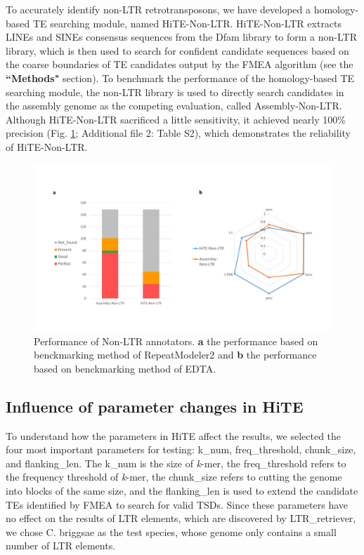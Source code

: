 \documentclass{bmcart}
\begin{document}
To accurately identify non-LTR retrotransposons, we have developed a homology-based TE searching module, named HiTE-Non-LTR. HiTE-Non-LTR extracts LINEs and SINEs consensus sequences from the Dfam library to form a non-LTR library, which is then used to search for confident candidate sequences based on the coarse boundaries of TE candidates output by the FMEA algorithm (see the \textbf{``Methods"} section). To benchmark the performance of the homology-based TE searching module, the non-LTR library is used to directly search candidates in the assembly genome as the competing evaluation, called Assembly-Non-LTR. Although HiTE-Non-LTR sacrificed a little sensitivity, it achieved nearly 100\% precision (Fig. \ref{fig:non_ltr_results}; Additional file 2: Table S2), which demonstrates the reliability of HiTE-Non-LTR.


\begin{figure}[h!]
	\centerline{\includegraphics[width=1.0\textwidth]{figures/NonLTRResults.pdf}}
	\caption{Performance of Non-LTR annotators. \textbf{a} the performance based on benckmarking method of RepeatModeler2 and \textbf{b} the performance based on benckmarking method of EDTA.}
	\label{fig:non_ltr_results}
\end{figure}


\subsection*{Influence of parameter changes in HiTE}
To understand how the parameters in HiTE affect the results, we selected the four most important parameters for testing: k\_num, freq\_threshold, chunk\_size, and flanking\_len. The k\_num is the size of \emph{k}-mer, the freq\_threshold refers to the frequency threshold of \emph{k}-mer, the chunk\_size refers to cutting the genome into blocks of the same size, and the flanking\_len is used to extend the candidate TEs identified by FMEA to search for valid TSDs. Since these parameters have no effect on the results of LTR elements, which are discovered by LTR\_retriever, we chose C. briggsae as the test species, whose genome only contains a small number of LTR elements.
\end{document}
